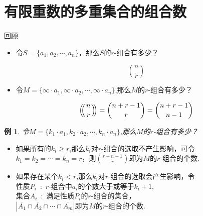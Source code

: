 \documentclass[punct]{ctexbeamer}
\newtheorem{ex}{例}
\def\multiset#1#2{\ensuremath{\left(\kern-.3em\left(\genfrac{}{}{0pt}{}{#1}{#2}\right)\kern-.3em\right)}}
\begin{document}
\section{有限重数的多重集合的组合数}


\begin{frame}{回顾}
	\begin{itemize}
		\item 令$S=\{a_{1},a_{2},\cdots,a_{n}\}$，那么$S$的$r$-组合有多少？\pause

    	\[\binom{n}{r} \]
\vspace{3pt}


		\item 令$M=\{\infty\cdot a_{1},\infty\cdot a_{2},\cdots,\infty\cdot a_{n} \}$,那么$M$的$r$-组合有多少？\pause

%
	$$
    \multiset{n}{r} = \binom{n+r-1}{r}=\binom{n+r-1}{n-1}
		$$

	\end{itemize}
\end{frame}

\begin{frame}
	\begin{ex}
		令$M=\{k_{1}\cdot a_{1},k_{2}\cdot a_{2},\cdots,k_{n}\cdot a_{n} \}$,那么$M$的$r$-组合有多少？
	\end{ex}
\pause
\begin{itemize}
	\item 如果所有的$k_{i}\geq r$,那么$k_{i}$对$r$-组合的选取不产生影响，可令$k_{1}=k_{2}=\cdots=k_{n}=r$，则$\binom{r+n-1}{r}$即为$M$的$r$-组合的个数.
	\item 如果存在某个$k_{i}<r$,那么$k_{i}$对$r$-组合的选取会产生影响，令\\性质$P_{i}$\, :\, $r$-组合中$a_{i}$的个数\alert{大于或等于$k_{i}+1$},\\
    集合$A_{i}$\, :\, 满足性质$P_{i}$的$r$-组合的集合，\\$|\overline{A_{1}} \cap \overline{A_{2}} \cap \cdots \cap \overline{A_{m}}| $即为$M$的$r$-组合的个数.
\end{itemize}
\end{frame}
\end{document}
